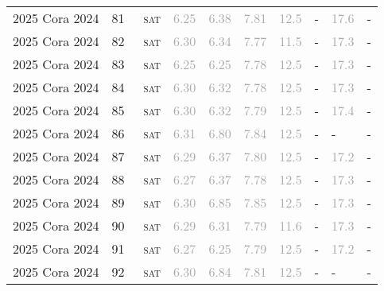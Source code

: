\begin{center}
{\begin{longtable}{@{}llllllllll@{}}
2025 Cora 2024 & 81 & ~\textsc{sat} & \textcolor{darkgray}{6.25} & \textcolor{darkgray}{6.38} & \textcolor{darkgray}{7.81} & \textcolor{darkgray}{12.5} & - & \textcolor{darkgray}{17.6} & - \\
2025 Cora 2024 & 82 & ~\textsc{sat} & \textcolor{darkgray}{6.30} & \textcolor{darkgray}{6.34} & \textcolor{darkgray}{7.77} & \textcolor{darkgray}{11.5} & - & \textcolor{darkgray}{17.3} & - \\
2025 Cora 2024 & 83 & ~\textsc{sat} & \textcolor{darkgray}{6.25} & \textcolor{darkgray}{6.25} & \textcolor{darkgray}{7.78} & \textcolor{darkgray}{12.5} & - & \textcolor{darkgray}{17.3} & - \\
2025 Cora 2024 & 84 & ~\textsc{sat} & \textcolor{darkgray}{6.30} & \textcolor{darkgray}{6.32} & \textcolor{darkgray}{7.78} & \textcolor{darkgray}{12.5} & - & \textcolor{darkgray}{17.3} & - \\
2025 Cora 2024 & 85 & ~\textsc{sat} & \textcolor{darkgray}{6.30} & \textcolor{darkgray}{6.32} & \textcolor{darkgray}{7.79} & \textcolor{darkgray}{12.5} & - & \textcolor{darkgray}{17.4} & - \\
2025 Cora 2024 & 86 & ~\textsc{sat} & \textcolor{darkgray}{6.31} & \textcolor{darkgray}{6.80} & \textcolor{darkgray}{7.84} & \textcolor{darkgray}{12.5} & - & - & - \\
2025 Cora 2024 & 87 & ~\textsc{sat} & \textcolor{darkgray}{6.29} & \textcolor{darkgray}{6.37} & \textcolor{darkgray}{7.80} & \textcolor{darkgray}{12.5} & - & \textcolor{darkgray}{17.2} & - \\
2025 Cora 2024 & 88 & ~\textsc{sat} & \textcolor{darkgray}{6.27} & \textcolor{darkgray}{6.37} & \textcolor{darkgray}{7.78} & \textcolor{darkgray}{12.5} & - & \textcolor{darkgray}{17.3} & - \\
2025 Cora 2024 & 89 & ~\textsc{sat} & \textcolor{darkgray}{6.30} & \textcolor{darkgray}{6.85} & \textcolor{darkgray}{7.85} & \textcolor{darkgray}{12.5} & - & \textcolor{darkgray}{17.3} & - \\
2025 Cora 2024 & 90 & ~\textsc{sat} & \textcolor{darkgray}{6.29} & \textcolor{darkgray}{6.31} & \textcolor{darkgray}{7.79} & \textcolor{darkgray}{11.6} & - & \textcolor{darkgray}{17.3} & - \\
2025 Cora 2024 & 91 & ~\textsc{sat} & \textcolor{darkgray}{6.27} & \textcolor{darkgray}{6.25} & \textcolor{darkgray}{7.79} & \textcolor{darkgray}{12.5} & - & \textcolor{darkgray}{17.2} & - \\
2025 Cora 2024 & 92 & ~\textsc{sat} & \textcolor{darkgray}{6.30} & \textcolor{darkgray}{6.84} & \textcolor{darkgray}{7.81} & \textcolor{darkgray}{12.5} & - & - & - \\

\end{longtable}}
\end{center}
